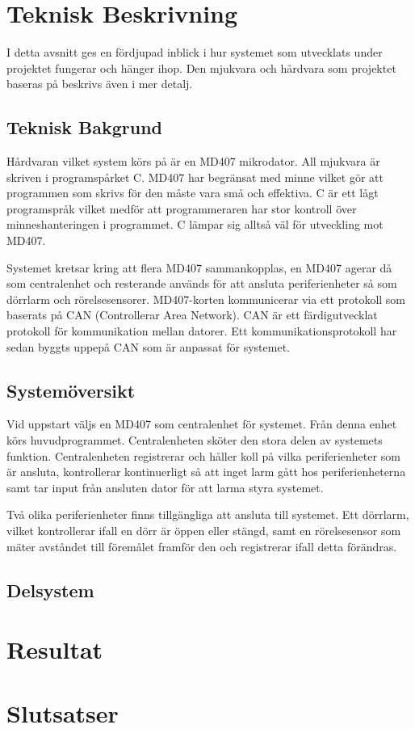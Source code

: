 \documentclass[a4paper]{article}
\begin{document}
\section{Teknisk Beskrivning}
I detta avsnitt ges en fördjupad inblick i hur systemet som utvecklats under projektet fungerar och hänger ihop. Den mjukvara och hårdvara som projektet baseras på beskrivs även i mer detalj.

\subsection{Teknisk Bakgrund}
Hårdvaran vilket system körs på är en MD407 mikrodator. All mjukvara är skriven i programspårket C. MD407 har begränsat med minne vilket gör att programmen som skrivs för den måste vara små och effektiva. C är ett lågt programspråk vilket medför att programmeraren har stor kontroll över minneshanteringen i programmet. C lämpar sig alltså väl för utveckling mot MD407.

Systemet kretsar kring att flera MD407 sammankopplas, en MD407 agerar då som centralenhet och resterande används för att ansluta periferienheter så som dörrlarm och rörelsesensorer. MD407-korten kommunicerar via ett protokoll som baserats på CAN (Controllerar Area Network). CAN är ett färdigutvecklat protokoll för kommunikation mellan datorer. Ett kommunikationsprotokoll har sedan byggts uppepå CAN som är anpassat för systemet.

\subsection{Systemöversikt}

Vid uppstart väljs en MD407 som centralenhet för systemet. Från denna enhet körs huvudprogrammet. Centralenheten sköter den stora delen av systemets funktion. Centralenheten registrerar och håller koll på vilka periferienheter som är ansluta, kontrollerar kontinuerligt så att inget larm gått hos periferienheterna samt tar input från ansluten dator för att larma styra systemet.

Två olika periferienheter finns tillgängliga att ansluta till systemet. Ett dörrlarm, vilket kontrollerar ifall en dörr är öppen eller stängd, samt en rörelsesensor som mäter avståndet till föremålet framför den och registrerar ifall detta förändras.

\subsection{Delsystem}

\section{Resultat}

\section{Slutsatser}





\end{document}
